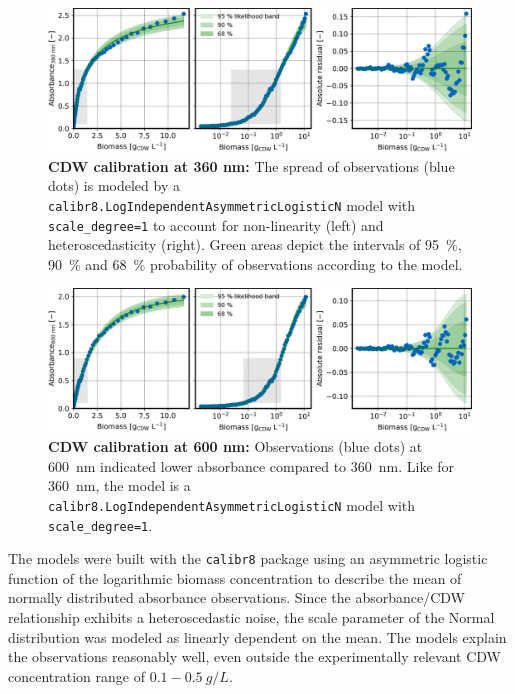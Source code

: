 \documentclass[sn-standardnature]{sn-jnl}%
\theoremstyle{thmstyleone}%
\theoremstyle{thmstyletwo}%
\theoremstyle{thmstylethree}%
\begin{document}
\begin{figure}[h]
    \centering
    \includegraphics[width=1.0\textwidth]{figures/cm_biomass_A360.png}
    \caption{
        \textbf{CDW calibration at 360 nm:}
        The spread of observations (blue dots) is modeled by a \texttt{calibr8.LogIndependentAsymmetricLogisticN} model with \texttt{scale\_degree=1} to account for non-linearity (left) and heteroscedasticity (right). 
        Green areas depict the intervals of 95~\%, 90~\% and 68~\% probability of observations according to the model.
    }
    \label{fig_cmXA360}
\end{figure}

\begin{figure}[h]
    \centering
    \includegraphics[width=1.0\textwidth]{figures/cm_biomass_A600.png}
    \caption{
        \textbf{CDW calibration at 600 nm:}
        Observations (blue dots) at 600~nm indicated lower absorbance compared to 360~nm. Like for 360~nm, the model is a \texttt{calibr8.LogIndependentAsymmetricLogisticN} model with \texttt{scale\_degree=1}.
    }
    \label{fig_cmXA600}
\end{figure}

The models were built with the \texttt{calibr8} package \cite{calibr8,calibr8Paper} using an asymmetric logistic function of the logarithmic biomass concentration to describe the mean of normally distributed absorbance observations.
Since the absorbance/CDW relationship exhibits a heteroscedastic noise, the scale parameter of the Normal distribution was modeled as linearly dependent on the mean.
The models explain the observations reasonably well, even outside the experimentally relevant CDW concentration range of $0.1-0.5~g/L$.
\end{document}
